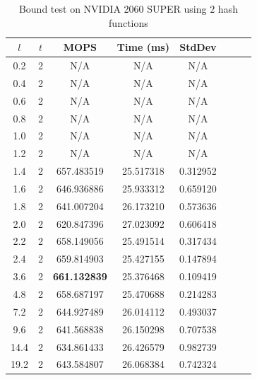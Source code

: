 \documentclass[10pt,twocolumn,letterpaper]{article}
\begin{document}
\begin{table}[!h]
    \centering
   \begin{tabular}{@{}c|ccccccc@{}}
\toprule
$l$ & $t$ & MOPS    & Time (ms)& StdDev  \\ \midrule
0.2 & 2 & N/A & N/A & N/A \\
0.4 & 2 & N/A & N/A & N/A \\
0.6 & 2 & N/A & N/A & N/A \\
0.8 & 2 & N/A & N/A & N/A \\
1.0 & 2 & N/A & N/A & N/A \\
1.2 & 2 & N/A & N/A & N/A \\
1.4 & 2 & 657.483519 & 25.517318 & 0.312952 \\
1.6 & 2 & 646.936886 & 25.933312 & 0.659120 \\
1.8 & 2 & 641.007204 & 26.173210 & 0.573636 \\
2.0 & 2 & 620.847396 & 27.023092 & 0.606418 \\
2.2 & 2 & 658.149056 & 25.491514 & 0.317434 \\
2.4 & 2 & 659.814903 & 25.427155 & 0.147894 \\
3.6 & 2 & \textbf{661.132839} & 25.376468 & 0.109419 \\
4.8 & 2 & 658.687197 & 25.470688 & 0.214283 \\
7.2 & 2 & 644.927489 & 26.014112 & 0.493037 \\
9.6 & 2 & 641.568838 & 26.150298 & 0.707538 \\
14.4 & 2 & 634.861433 & 26.426579 & 0.982739 \\
19.2 & 2 & 643.584807 & 26.068384 & 0.742324 \\
\bottomrule
\end{tabular}
    \caption{Bound test on NVIDIA 2060 SUPER using $2$ hash functions}
    \label{tab:bound_2_2060}
\end{table}
\end{document}
